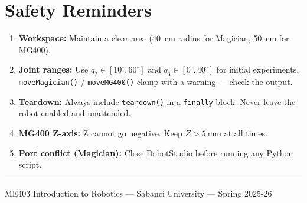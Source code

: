 \documentclass[11pt,a4paper]{article}
\begin{document}
\section{Safety Reminders}

\begin{tcolorbox}[safetybox, title={Mandatory Safety Rules}]
\begin{enumerate}
  \item \textbf{Workspace:} Maintain a clear area (\qty{40}{\cm} radius for Magician, \qty{50}{\cm} for MG400).
  \item \textbf{Joint ranges:} Use $q_2 \in [10^{\circ},60^{\circ}]$ and $q_3 \in [0^{\circ},40^{\circ}]$ for initial experiments.
        \texttt{moveMagician()} / \texttt{moveMG400()} clamp with a warning --- check the output.
  \item \textbf{Teardown:} Always include \texttt{teardown()} in a \texttt{finally} block.
        Never leave the robot enabled and unattended.
  \item \textbf{MG400 Z-axis:} Z cannot go negative. Keep $Z > \qty{5}{\mm}$ at all times.
  \item \textbf{Port conflict (Magician):} Close DobotStudio before running any Python script.
\end{enumerate}
\end{tcolorbox}

\vfill
\rule{\linewidth}{0.4pt}
\begin{center}
  \small ME403 Introduction to Robotics --- Sabanci University --- Spring 2025-26
\end{center}
\end{document}
